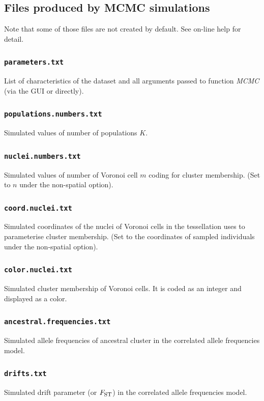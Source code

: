 \documentclass{article}
\newcommand{\Fst}{F_{\mbox{\footnotesize ST}}}
\begin{document}
\subsection{Files produced by MCMC simulations}

Note that some of those files are not created by default. See on-line help for detail.

\subsubsection{\texttt{parameters.txt}}
List of characteristics of the dataset and all arguments passed to function {\it MCMC} (via the GUI or directly).

\subsubsection{\texttt{populations.numbers.txt}}
Simulated values of number of populations $K$.

\subsubsection{\texttt{nuclei.numbers.txt}}
Simulated values of number of Voronoi cell $m$ coding for cluster membership. 
(Set to $n$ under the non-spatial option).


\subsubsection{\texttt{coord.nuclei.txt}}
Simulated coordinates of the nuclei of Voronoi cells in the tessellation uses to parameterise  cluster membership. 
(Set to the coordinates of sampled individuals under the non-spatial option).

\subsubsection{\texttt{color.nuclei.txt}}
Simulated cluster membership of  Voronoi cells. It is coded as an integer and displayed as a color. 


\subsubsection{\texttt{ancestral.frequencies.txt}}
Simulated allele frequencies of ancestral cluster in the correlated allele frequencies model. 

\subsubsection{\texttt{drifts.txt}}
Simulated drift parameter (or  $\Fst$) in the correlated allele frequencies model. 
\end{document}
